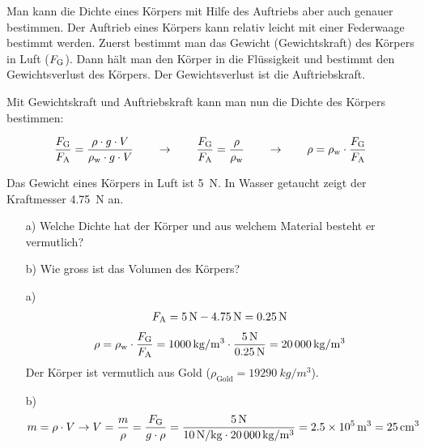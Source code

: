 Man kann die Dichte eines Körpers mit Hilfe des Auftriebs aber auch genauer bestimmen.
Der Auftrieb eines Körpers kann relativ leicht mit einer Federwaage bestimmt werden. Zuerst bestimmt man das Gewicht (Gewichtskraft)
des Körpers in Luft ($F_{\textrm G}$). Dann hält man den Körper in die Flüssigkeit und bestimmt den Gewichtsverlust
des Körpers. Der Gewichtsverlust ist die Auftriebskraft.

Mit Gewichtskraft und Auftriebskraft kann man nun die Dichte des Körpers bestimmen:

\begin{eqnarray*}
	\frac{F_{\textrm G}}{F_{\textrm A}}=\frac{\rho\cdot g\cdot V}{\rho_{\textrm w}\cdot g\cdot V} \qquad\to\qquad\frac{F_{\textrm G}}{F_{\textrm A}}=\frac{\rho}{\rho_{\textrm w}}\qquad\to\qquad \rho=\rho_{\textrm w}\cdot\frac{F_{\textrm G}}{F_{\textrm A}} 
\end{eqnarray*}


\begin{aufgabe}
	Das Gewicht eines Körpers in Luft ist \SI{5}{N}. In Wasser getaucht zeigt der Kraftmesser \SI{4.75}{N} an.
	\begin{itemize}	
		\item[a)] Welche Dichte hat der Körper und aus welchem Material besteht er vermutlich?
		\item[b)] Wie gross ist das Volumen des Körpers?
	\end{itemize}	


	\begin{loesung}
	\begin{itemize}	
		\item[a)]
			\begin{eqnarray*}
				F_{\textrm A}=\SI{5}{N}-\SI{4.75}{N}=\SI{0.25}{N}
			\end{eqnarray*}
			\begin{eqnarray*}
				\rho=\rho_{\textrm w}\cdot\frac{F_{\textrm G}}{F_{\textrm A}}=\SI{1000}{kg/m^3}\cdot\frac{\SI{5}{N}}{\SI{0.25}{N}}=\SI{20000}{kg/m^3} 
			\end{eqnarray*}
			Der Körper ist vermutlich aus Gold ($\rho_{\textrm{Gold}}=\SI{19290}{kg/m^3}$).
		\item[b)]
			\begin{eqnarray*}
				m=\rho\cdot V \to V=\frac{m}{\rho}=\frac{F_{\textrm G}}{g\cdot\rho} =\frac{\SI{5}{N}}{\SI{10}{N/kg}\cdot\SI{20000}{kg/m^3}}=\SI{2.5E5}{m^3}=\SI{25}{cm^3}
			\end{eqnarray*}
	\end{itemize}	
	\end{loesung}

\end{aufgabe}



